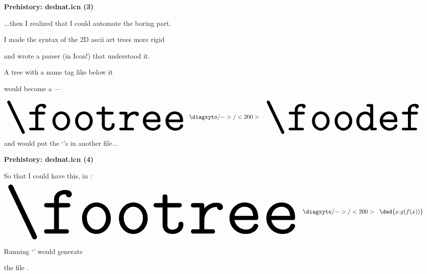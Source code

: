 \documentclass[oneside]{book}
\begin{document}

{\bf Prehistory: dednat.icn (3)}

...then I realized that I could automate the boring part.

I made the syntax of the 2D ascii art trees more rigid

and wrote a parser (in {\color{VioletDarkHard}Icon}!) that understood it.

A tree with a name tag like  below it

would become a  ---

%
%
%
%
%
\pu
$$
\myvcenter{\resizebox{!}{50pt}{\footree}}
\;\;\diagxyto/->/<200>\;\;
\myvcenter{\resizebox{!}{50pt}{\foodef}}
$$
%
and would put the `'s in another file...


\newpage


{\bf Prehistory: dednat.icn (4)}

So that I could have this, in :
%
%
%
\pu
$$
\myvcenter{\resizebox{!}{80pt}{\footree}}
\;\;\diagxyto/->/<200>\;\;
\myvcenter{\ded{x.g(f(x))}}
$$

Running `' would generate

the file .




\newpage

%                                          
\end{document}
